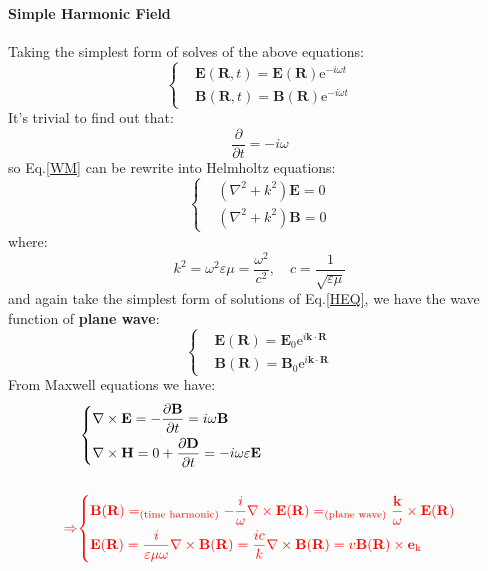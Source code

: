 \documentclass[11pt,a4paper,oneside]{book}
\begin{document}
\paragraph{Simple Harmonic Field} Taking the simplest form of solves of the above equations:\begin{equation}\label{harmonic}
	\left\{
	\begin{aligned}
		&\mathbf{E}(\mathbf{R},t)=\mathbf{E}(\mathbf{R})\text{e}^{-i\omega t}\\
		&\mathbf{B}(\mathbf{R},t)=\mathbf{B}(\mathbf{R})\text{e}^{-i\omega t}
	\end{aligned}
	\right.
\end{equation}
It's trivial to find out that:
\begin{equation}
		\frac{\partial}{\partial t}=-i\omega
\end{equation}
so Eq.\ref{WM} can be rewrite into Helmholtz equations:\begin{equation}\label{HEQ}\left\{
	\begin{aligned}
		&\left(\nabla^2+k^2 \right)\mathbf{E}=0\\
		&\left(\nabla^2+k^2 \right)\mathbf{B}=0
	\end{aligned}
	\right.
\end{equation}where:\begin{equation}
	k^2=\omega^2\varepsilon\mu=\frac{\omega^2}{c^2},\quad c=\frac{1}{\sqrt{\varepsilon\mu}}
\end{equation}
 and again take the simplest form of solutions of Eq.\ref{HEQ}, we have the wave function of \textbf{plane wave}:\begin{equation}\label{plane}\left\{
 	\begin{aligned}
 		&\mathbf{E}(\mathbf{R})=\mathbf{E}_0\text{e}^{i\mathbf{k}\cdot\mathbf{R}}\\
 		&\mathbf{B}(\mathbf{R})=\mathbf{B}_0\text{e}^{i\mathbf{k}\cdot\mathbf{R}}
 	\end{aligned}\right.
 \end{equation}
From Maxwell equations we have:\begin{equation}\label{eq122}\begin{aligned}
	&\left\{
	\begin{aligned}
		&\nabla\times\mathbf{E}=-\frac{\partial\mathbf{B}}{\partial t}=i\omega\mathbf{B}\\
		&\nabla\times\mathbf{H}=0+\frac{\partial \mathbf{D}}{\partial t}=-i\omega\varepsilon \mathbf{E}
	\end{aligned}\right.\\\\
	\textcolor{red}{\Rightarrow}&\textcolor{red}{
	\left\{
	\begin{aligned}
		&\mathbf{B}(\mathbf{R})=_\text{(time harmonic)}-\frac{i}{\omega}\nabla\times\mathbf{E}(\mathbf{R})=_\text{(plane wave)}\frac{\mathbf{k}}{\omega}\times\mathbf{E}(\mathbf{R})\\
		&\mathbf{E}(\mathbf{R})=\frac{i}{\varepsilon\mu\omega}\nabla\times\mathbf{B}(\mathbf{R})=\frac{ic}{k}\nabla\times\mathbf{B}(\mathbf{R})=v\mathbf{B}(\mathbf{R})\times\mathbf{e}_\text{k}
	\end{aligned}
	\right.}	
\end{aligned}
\end{equation}
\end{document}
